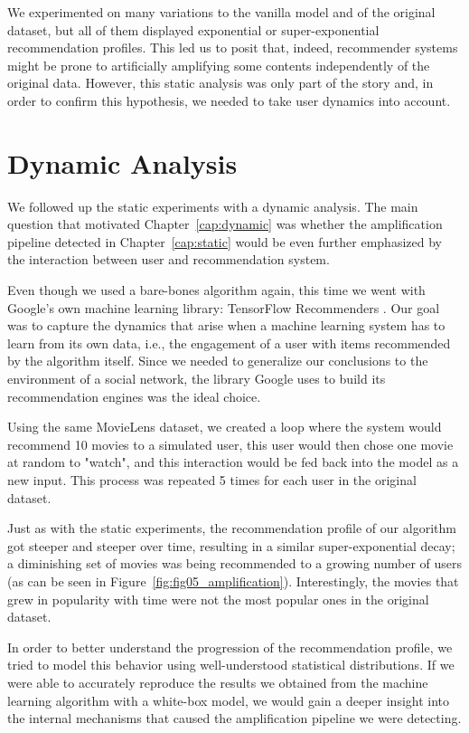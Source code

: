 We experimented on many variations to the vanilla model and of the original
dataset, but all of them displayed exponential or super-exponential
recommendation profiles. This led us to posit that, indeed, recommender systems
might be prone to artificially amplifying some contents independently of the
original data. However, this static analysis was only part of the story and, in
order to confirm this hypothesis, we needed to take user dynamics into account.

\section{Dynamic Analysis}
\label{sec:dynamic}

We followed up the static experiments with a dynamic analysis. The main
question that motivated Chapter~\ref{cap:dynamic} was whether the amplification
pipeline detected in Chapter~\ref{cap:static} would be even further emphasized
by the interaction between user and recommendation system.

Even though we used a bare-bones algorithm again, this time we went with
Google's own machine learning library: TensorFlow Recommenders
\citep{noauthor_tensorflow_nodate}. Our goal was to capture the dynamics that
arise when a machine learning system has to learn from its own data, i.e., the
engagement of a user with items recommended by the algorithm itself. Since we
needed to generalize our conclusions to the environment of a social network, the
library Google uses to build its recommendation engines was the ideal choice.

Using the same MovieLens \citep{harper_movielens_2015} dataset, we created a
loop where the system would recommend 10 movies to a simulated user, this user
would then chose one movie at random to "watch", and this interaction would be
fed back into the model as a new input. This process was repeated 5 times for
each user in the original dataset.

Just as with the static experiments, the recommendation profile of our algorithm
got steeper and steeper over time, resulting in a similar super-exponential
decay; a diminishing set of movies was being recommended to a growing number of
users (as can be seen in Figure~\ref{fig:fig05_amplification}). Interestingly,
the movies that grew in popularity with time were not the most popular ones in
the original dataset.

In order to better understand the progression of the recommendation profile, we
tried to model this behavior using well-understood statistical distributions. If
we were able to accurately reproduce the results we obtained from the machine
learning algorithm with a white-box model, we would gain a deeper insight into
the internal mechanisms that caused the amplification pipeline we were
detecting.

